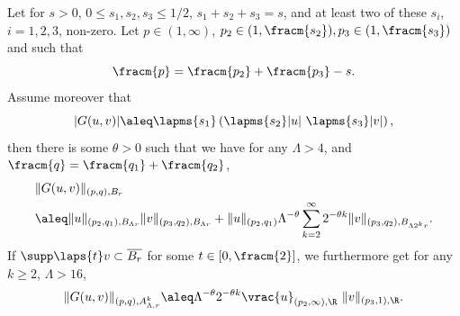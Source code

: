 \begin{lemma}  \label{lem:LowerOrderProducts.v2}
  Let for $s > 0$, $0 \leq s_{1}, s_{2}, s_{3} \leq 1/2$, $s_{1} + s_{2}+ s_{3} = s$, and at least two of these $s_i$, $i=1,2,3$, non-zero. Let $p \in (1,\infty)$, $p_2 \in (1,\fracm{s_2}),p_3 \in (1,\fracm{s_3})$ and such that
  \[
   \fracm{p} = \fracm{p_2} + \fracm{p_3} - s.
  \]
Assume moreover that
\begin{equation*}
  |G(u,v)| \aleq \lapms{s_{1}} \left( \lapms{s_{2}}  |u|\ 
  \lapms{s_{3}} |v|\right),
 \end{equation*}
 then there is some $\theta>0$ such that
 we have for any $\Lambda>4$, and $\fracm{q} = \fracm{q_1}+ \fracm{q_2}$,
 \begin{align}\label{eq:Guvest}
    &\|G(u,v)\|_{(p, q), B_r} \\ \nonumber
  &\aleq \|u\|_{(p_2,q_1),B_{\Lambda r}} \|v\|_{(p_3,q_2),B_{\Lambda r}} + \|u\|_{(p_2,q_1)}
    \Lambda^{-\theta}\sum_{k=2}^\infty 2^{-\theta k}\|v\|_{(p_3,q_2),B_{\Lambda 2^k r}}.
 \end{align}
 If $\supp \laps{t}v  \subset \overline{B_r}$ for some $t \in [0,\fracm{2}]$, 
 we furthermore get for any $k \geq 2$, $\Lambda > 16$,
 \begin{equation}\label{eq:Ginversedssupport}
  \|G(u,v)\|_{(p,q),A^k_{\Lambda,r}} 
  \aleq \Lambda^{-\theta} 2^{-\theta k} \vrac{u}_{(p_2,\infty),\R}\ \|v\|_{(p_3, 1),\R}.
 \end{equation}
\end{lemma}
